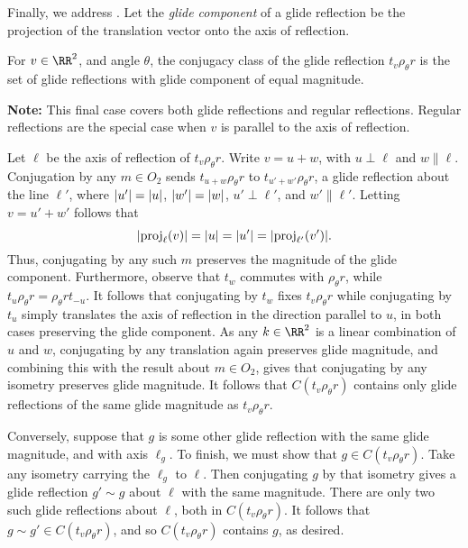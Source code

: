\documentclass{scrartcl}
\begin{document}
\begin{solution}
        Finally, we address . Let the \textit{glide component} of a glide reflection be the projection of the translation vector onto the axis of reflection.
        \begin{lemma}
        For $v\in \RR^2$, and angle $\theta$, the conjugacy class of the glide reflection $t_v\rho_\theta r$ is the set of glide reflections with glide component of equal magnitude.
        \end{lemma}
        \textbf{Note:} This final case covers both glide reflections and regular reflections. Regular reflections are the special case when $v$ is parallel to the axis of reflection.
        \begin{subproof}
        Let $\ell$ be the axis of reflection of $t_v\rho_\theta r$. Write $v=u+w$, with $u\perp \ell$ and $w\parallel \ell$. Conjugation by any $m\in O_2$ sends $t_{u+w}\rho_\theta r$ to $t_{u'+w'}\rho_\theta r$, a glide reflection about the line $\ell'$, where $\lvert u'\rvert=\lvert u\rvert$, $\lvert w'\rvert=\lvert w\rvert$, $u'\perp \ell'$, and $w'\parallel \ell'$. Letting $v=u'+w'$ follows that
        \[\lvert\operatorname{proj}_\ell(v)\rvert=\lvert u\rvert=\lvert u'\rvert=\lvert\operatorname{proj}_{\ell'}(v')\rvert.\] Thus, conjugating by any such $m$ preserves the magnitude of the glide component. Furthermore, observe that $t_w$ commutes with $\rho_\theta r$, while $t_u\rho_\theta r=\rho_\theta rt_{-u}$. It follows that conjugating by $t_w$ fixes $t_v\rho_\theta r$ while conjugating by $t_u$ simply translates the axis of reflection in the direction parallel to $u$, in both cases preserving the glide component. As any $k\in \RR^2$ is a linear combination of $u$ and $w$, conjugating by any translation again preserves glide magnitude, and combining this with the result about $m\in O_2$, gives that conjugating by any isometry preserves glide magnitude. It follows that $C(t_v\rho_\theta r)$ contains only glide reflections of the same glide magnitude as $t_v\rho_\theta r$.
        
        Conversely, suppose that $g$ is some other glide reflection with the same glide magnitude, and with axis $\ell_g$. To finish, we must show that $g\in C(t_v\rho_\theta r)$. Take any isometry carrying the $\ell_g$ to $\ell$. Then conjugating $g$ by that isometry gives a glide reflection $g'\sim g$ about $\ell$ with the same magnitude. There are only two such glide reflections about $\ell$, both in $C(t_v\rho_\theta r)$. It follows that $g\sim g'\in C(t_v\rho_\theta r)$, and so $C(t_v\rho_\theta r)$ contains $g$, as desired.
        \end{subproof}
    

\end{solution}
\end{document}
